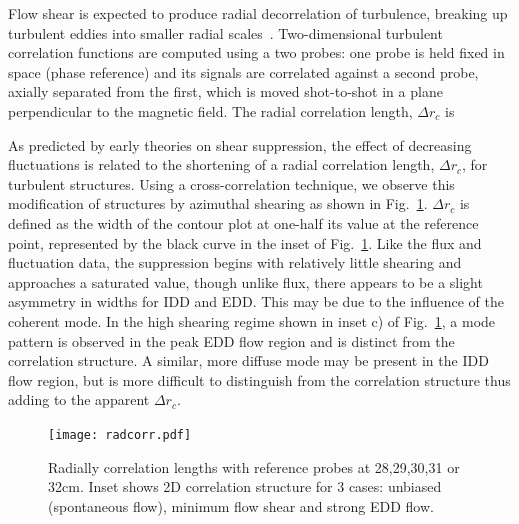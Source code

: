 \documentclass[aps,prl,amsmath,amssymb,preprint,superscriptaddress]{revtex4}
\begin{document}
Flow shear is expected to produce radial decorrelation of turbulence,
breaking up turbulent eddies into smaller radial scales~\cite{}.
Two-dimensional turbulent correlation functions are computed using a
two probes: one probe is held fixed in space (phase reference) and
its signals are correlated against a second probe, axially separated
from the first, which is moved shot-to-shot in a plane perpendicular
to the magnetic field.  The radial correlation length, $\Delta r_c$ is 


As predicted by early theories on shear suppression, the effect of decreasing fluctuations is related to the shortening of a radial correlation length, $\Delta r_{c}$, for turbulent structures. Using a cross-correlation technique, we observe this modification of structures by azimuthal shearing as shown in Fig.~\ref{fig:radcorr}. $\Delta r_{c}$ is defined as the width of the contour plot at one-half its value at the reference point, represented by the black curve in the inset of Fig.~\ref{fig:radcorr}. Like the flux and fluctuation data, the suppression begins with relatively little shearing and approaches a saturated value, though unlike flux, there appears to be a slight asymmetry in widths for IDD and EDD. This may be due to the influence of the coherent mode. In the high shearing regime shown in inset c) of Fig.~\ref{fig:radcorr}, a mode pattern is observed in the peak EDD flow region and is distinct from the correlation structure. A similar, more diffuse mode may be present in the IDD flow region, but is more difficult to distinguish from the correlation structure thus adding to the apparent $\Delta r_{c}$.

\begin{figure}[!htbp]
\centerline{
\texttt{[image: radcorr.pdf]}}
\caption{\label{fig:radcorr} Radially correlation lengths with
  reference probes at 28,29,30,31 or 32cm. Inset shows 2D correlation
  structure for 3 cases: unbiased (spontaneous flow), minimum flow
  shear and strong EDD flow.}
\end{figure}
\end{document}
